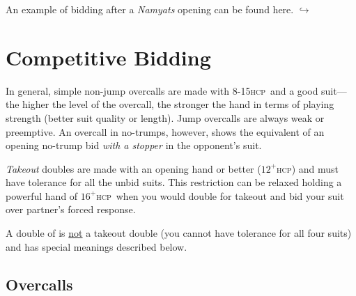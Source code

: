 \documentclass[a4paper,article,oneside]{memoir}
\newcommand{\hcp}{\textsc{hcp}}
\newcommand{\hyp}[1]{\hyperlink{#1}{$\hookrightarrow$}} %
\begin{document}
An example of bidding after a \emph{Namyats} opening can be found
here. \hyp{namyats}

\pagebreak

\section{Competitive Bidding}

In general, simple non-jump overcalls are made with 8-15\hcp\ and a
good suit---the higher the level of the overcall, the stronger the
hand in terms of playing strength (better suit quality or length).
Jump overcalls are always weak or preemptive. An overcall in
no-trumps, however, shows the equivalent of an opening no-trump bid
\emph{with a stopper} in the opponent's suit.

\emph{Takeout} doubles are made with an opening hand or better
($12^+$\hcp) and must have tolerance for all the unbid suits. This
restriction can be relaxed holding a powerful hand of $16^+$\hcp\ when
you would double for takeout and bid your suit over partner's forced
response.

A double of  is \underline{not} a takeout double (you cannot
have tolerance for all four suits) and has special meanings described
below.

\subsection{Overcalls}
\end{document}

